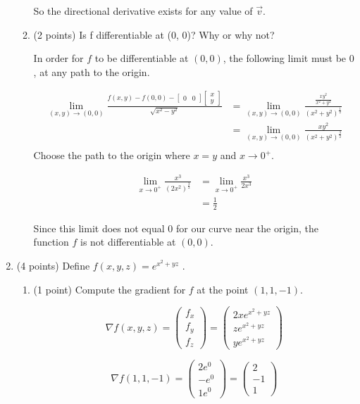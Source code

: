 \documentclass{article}
\begin{document}
\begin{enumerate}
\begin{enumerate}[label= (\alph*)]
So the directional derivative exists for any value of $\vec v$.

\item (2 points) Is f differentiable at (0, 0)? Why or why not?

In order for $f$ to be differentiable at $(0,0)$, the following limit must be $0$, at any path to the origin.

\begin{align*}
\lim_{(x,y)\to(0,0)}\frac{f(x,y)-f(0,0)-\begin{bmatrix} 0&0 \end{bmatrix}\begin{bmatrix} x\\y\end{bmatrix}}{\sqrt{x^2-y^2}}&=\lim_{(x,y)\to(0,0)}\frac{\frac{xy^2}{x^2+y^2}}{(x^2+y^2)^{\frac{1}{2}}}\\
&=\lim_{(x,y)\to(0,0)}\frac{xy^2}{(x^2+y^2)^{\frac{3}{2}}}\\
\end{align*}
Choose the path to the origin where $x=y$ and $x\to 0^{+}$.

\begin{align*} \lim_{x\to0^+}\frac{x^3}{(2x^2)^{\frac{3}{2}}}&=\lim_{x\to0^+}\frac{x^3}{2x^3}\\
&=\frac{1}{2}
\end{align*}

Since this limit does not equal $0$ for our curve near the origin, the function $f$ is not differentiable at $(0,0)$.

\end{enumerate}
\item  (4 points) Define $f (x, y, z) = e^{x^2+yz}$ .
\begin{enumerate}[label= (\alph*)]  
\item (1 point) Compute the gradient for $f$ at the point $(1, 1, -1)$.

$$\nabla f(x,y,z)=\begin{pmatrix}f_x\\f_y\\f_z\end{pmatrix}=\begin{pmatrix}2xe^{x^2+yz}\\ze^{x^2+yz}\\ye^{x^2+yz}\end{pmatrix}$$

$$\nabla f(1,1,-1)=\begin{pmatrix}2e^{0}\\-e^{0}\\1e^{0}\end{pmatrix}=\begin{pmatrix}2\\-1\\1\end{pmatrix}$$


\end{enumerate}
\end{enumerate}
\end{document}
